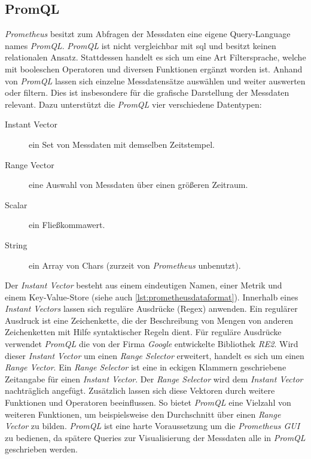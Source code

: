 \documentclass[titlepage]{report}
\begin{document}
\subsection*{PromQL}
\emph{Prometheus} besitzt zum Abfragen der Messdaten eine eigene
Query\hyp{}Language names \emph{PromQL}. \emph{PromQL} ist nicht
vergleichbar mit \gls{sql} und besitzt keinen relationalen Ansatz.
Stattdessen handelt es sich um eine Art Filtersprache, welche mit
booleschen Operatoren und diversen Funktionen ergänzt worden ist.
Anhand von \emph{PromQL} lassen sich einzelne Messdatensätze auswählen
und weiter auswerten oder filtern\cite{PROMETHEUS_PROMQL}. Dies ist insbesondere für die
grafische Darstellung der Messdaten relevant. Dazu unterstützt die
\emph{PromQL} vier verschiedene Datentypen\cite{PROMETHEUS_PROMQL}:
\begin{description}
    \item[Instant Vector] ein Set von Messdaten mit demselben
        Zeitstempel.
    \item[Range Vector] eine Auswahl von Messdaten über einen größeren
        Zeitraum.
    \item[Scalar] ein Fließkommawert.
    \item[String] ein Array von Chars (zurzeit von \emph{Prometheus} unbenutzt).
\end{description}
Der \emph{Instant Vector} besteht aus einem eindeutigen Namen, einer Metrik und
einem Key\hyp{}Value\hyp{}Store (siehe auch
\autoref{lst:prometheusdataformat}). Innerhalb eines \emph{Instant Vectors}
lassen sich reguläre Ausdrücke (Regex) anwenden. Ein regulärer Ausdruck ist
eine Zeichenkette, die der Beschreibung von Mengen von anderen Zeichenketten
mit Hilfe syntaktischer Regeln dient\cite{REGEXWIKI}. Für reguläre Ausdrücke
verwendet \emph{PromQL} die von der Firma \emph{Google} entwickelte Bibliothek
\emph{RE2}\cite{RE2}. Wird dieser \emph{Instant Vector} um einen \emph{Range
Selector} erweitert, handelt es sich um einen \emph{Range Vector}. Ein
\emph{Range Selector} ist eine in eckigen Klammern geschriebene Zeitangabe für
einen \emph{Instant Vector}. Der \emph{Range Selector} wird dem \emph{Instant
Vector} nachträglich angefügt.  Zusätzlich lassen sich diese Vektoren durch
weitere Funktionen und Operatoren beeinflussen. So bietet \emph{PromQL} eine
Vielzahl von weiteren Funktionen, um beispielsweise den Durchschnitt über einen
\emph{Range Vector} zu bilden\cite{PROMETHEUS_PROMQL_FUNCTIONS}. \emph{PromQL}
ist eine harte Voraussetzung um die \emph{Prometheus GUI} zu bedienen, da
spätere Queries zur Visualisierung der Messdaten alle in \emph{PromQL}
geschrieben werden.
\end{document}
